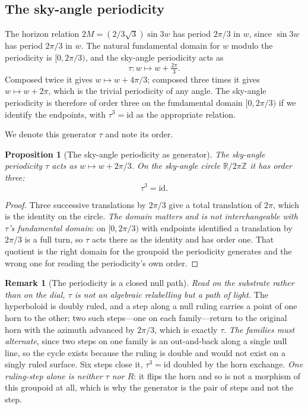 \documentclass[11pt,a4paper]{article}
\newtheorem{proposition}[theorem]{Proposition}
\theoremstyle{definition}
\newtheorem{remark}[theorem]{Remark}
\begin{document}
\subsection{The sky-angle periodicity}\label{sec:periodicity}

The horizon relation $2M=(2/3\sqrt{3})\sin 3w$ has period $2\pi/3$ in $w$, since $\sin 3w$ has period $2\pi/3$ in $w$. The natural fundamental domain for $w$ modulo the periodicity is $[0,2\pi/3)$, and the sky-angle periodicity acts as
\begin{equation}\label{eq:periodicity}
\tau: w\mapsto w + \tfrac{2\pi}{3}.
\end{equation}
Composed twice it gives $w\mapsto w+4\pi/3$; composed three times it gives $w\mapsto w+2\pi$, which is the trivial periodicity of any angle. The sky-angle periodicity is therefore of order three on the fundamental domain $[0,2\pi/3)$ if we identify the endpoints, with $\tau^{3}=\text{id}$ as the appropriate relation.

We denote this generator $\tau$ and note its order.

\begin{proposition}[The sky-angle periodicity as generator]\label{prop:tau}
The sky-angle periodicity $\tau$ acts as $w\mapsto w+2\pi/3$. On the sky-angle circle $\mathbb{R}/2\pi\mathbb{Z}$ it has order three:
\[
\tau^{3}=\text{id}.
\]
\end{proposition}

\begin{proof}
Three successive translations by $2\pi/3$ give a total translation of $2\pi$, which is the identity on the circle. \emph{The domain matters and is not interchangeable with $\tau$'s fundamental domain}: on $[0,2\pi/3)$ with endpoints identified a translation by $2\pi/3$ is a full turn, so $\tau$ acts there as the identity and has order one. That quotient is the right domain for the groupoid the periodicity generates and the wrong one for reading the periodicity's own order.
\end{proof}

\begin{remark}[The periodicity is a closed null path]\label{rem:tau-light}
\emph{Read on the substrate rather than on the dial, $\tau$ is not an algebraic relabelling but a path of light.} The hyperboloid is doubly ruled, and a step along a null ruling carries a point of one horn to the other; two such steps---one on each family---return to the original horn with the azimuth advanced by $2\pi/3$, which is exactly $\tau$. \emph{The families must alternate}, since two steps on one family is an out-and-back along a single null line, so the cycle exists because the ruling is double and would not exist on a singly ruled surface. Six steps close it, $\tau^{3}=\mathrm{id}$ doubled by the horn exchange. \emph{One ruling-step alone is neither $\tau$ nor $R$}: it flips the horn and so is not a morphism of this groupoid at all, which is why the generator is the pair of steps and not the step.
\end{remark}
\end{document}
